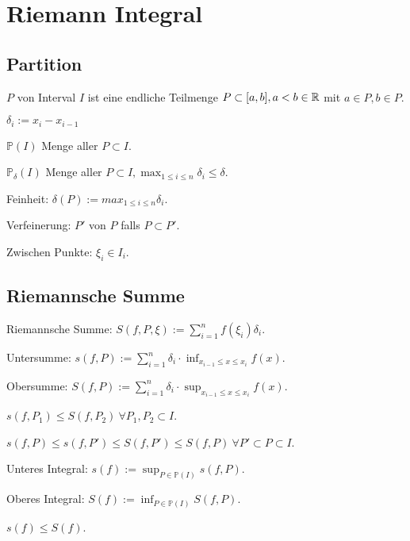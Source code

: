 
\section{Riemann Integral}
\subsection{Partition}
$P$ von Interval $I$ ist eine endliche Teilmenge $P \subset [a, b], a < b \in \mathbb{R}$ mit $a \in P, b \in P$.
\begin{inparaitem}
    \item $\delta_i := x_i - x_{i - 1}$
    \item $\mathbb{P}(I)$ Menge aller $P \subset I$.
    \item $\mathbb{P}_\delta(I)$ Menge aller $P \subset I, \max_{1 \le i \le n} \delta_i \le \delta$.
\end{inparaitem}
\begin{compactdesc}
    \item[Feinheit:] $\delta(P) := max_{1 \le i \le n} \delta_i$.
    \item[Verfeinerung:] $P'$ von $P$ falls $P \subset P'$.
    \item[Zwischen Punkte:] $\xi_i \in I_i$.
\end{compactdesc}

\subsection{Riemannsche Summe}
\begin{compactdesc}
\item[Riemannsche Summe:] $S(f, P, \xi) := \sum_{i=1}^{n} f(\xi_i) \delta_i$.
    \item[Untersumme:] $s(f, P) := \sum_{i=1}^{n} \delta_i \cdot \inf_{x_{i-1} \le x \le x_i} f(x)$.
    \item[Obersumme:] $S(f, P) := \sum_{i=1}^{n} \delta_i \cdot \sup_{x_{i-1} \le x \le x_i} f(x)$.
        \begin{compactitem}
            \item $s(f, P_1) \le S(f, P_2) \ \forall P_1, P_2 \subset I$.
            \item $s(f, P) \le s(f, P') \le S(f, P') \le S(f, P) \ \forall P' \subset P \subset I$.
        \end{compactitem}
    \item[Unteres Integral:] $s(f) := \sup_{P \in \mathbb{P}(I)} s(f, P)$.
    \item[Oberes Integral:] $S(f) := \inf_{P \in \mathbb{P}(I)} S(f, P)$.
        \begin{compactitem}
        \item $s(f) \le S(f)$.
        \end{compactitem}
\end{compactdesc}

